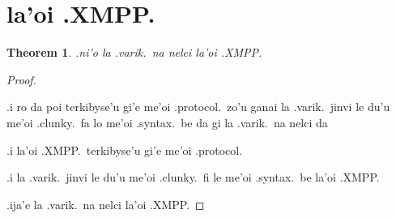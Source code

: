\documentclass{article}
\newtheorem{thm}{Theorem}
\begin{document}
\section{la'oi .XMPP.}
\begin{thm}
	.ni'o la .varik.\ na nelci la'oi .XMPP.
\end{thm}
\begin{proof}
	${}$

	.i ro da poi terkibyse'u gi'e me'oi .protocol.\ zo'u ganai la .varik.\ jinvi le du'u me'oi .clunky.\ fa lo me'oi .syntax.\ be da gi la .varik.\ na nelci da

	.i la'oi .XMPP.\ terkibyse'u gi'e me'oi .protocol.

	.i la .varik.\ jinvi le du'u me'oi .clunky.\ fi le me'oi .syntax.\ be la'oi .XMPP.

	.ija'e la .varik.\ na nelci la'oi .XMPP.
\end{proof}
\end{document}
